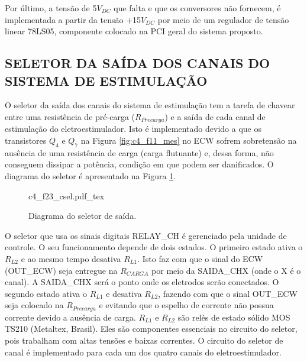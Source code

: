 Por último, a tensão de 5$V_{DC}$ que falta e que os conversores não fornecem, é implementada a partir da tensão +15$V_{DC}$ por meio de um regulador de tensão linear 78LS05, componente colocado na \acrshort{PCI} geral do sistema proposto.



\subsection{SELETOR DA SAÍDA DOS CANAIS DO SISTEMA DE ESTIMULAÇÃO} \label{sec:cap_sec4.2.6}

O seletor da saída dos canais do sistema de estimulação tem a tarefa de chavear entre uma resistência de pré-carga ($R_{Precarga}$) e a saída de cada canal de estimulação do eletroestimulador. Isto é implementado devido a que os transistores $Q_4$ e $Q_7$ na Figura \ref{fig:c4_f11_mes} no \acrshort{ECW} sofrem sobretensão na ausência de uma resistência de carga (carga flutuante) e, dessa forma, não conseguem dissipar a potência, condição em que podem ser danificados. O diagrama do seletor é apresentado na Figura \ref{fig:c4_f23_csel}. 

\begin{figure}[h]
    \centering %
    \small %
    \def\svgwidth{0.8\columnwidth}%
    {c4_f23_csel.pdf_tex}
    \caption{Diagrama do seletor de saída.}
    \label{fig:c4_f23_csel}
\end{figure}

O seletor que usa os sinais digitais RELAY\_CH é gerenciado pela unidade de controle. O seu funcionamento depende de dois estados. O primeiro estado ativa o $R_{L2}$ e ao mesmo tempo desativa $R_{L1}$. Isto faz com que o sinal do \acrshort{ECW} (OUT\_ECW) seja entregue na $R_{CARGA}$ por meio da SAIDA\_CHX (onde o X é o canal). A SAIDA\_CHX será o ponto onde os eletrodos serão conectados. O segundo estado ativa o $R_{L1}$ e desativa $R_{L2}$, fazendo com que o sinal OUT\_ECW seja colocado na $R_{Precarga}$ e evitando que o espelho de corrente não possua corrente devido a ausência de carga. $R_{L1}$ e $R_{L2}$ são relés de estado sólido \acrshort{MOS} TS210 (Metaltex, Brasil). Eles são componentes essenciais no circuito do seletor, pois trabalham com altas tensões e baixas correntes. O circuito do seletor de canal é implementado para cada um dos quatro canais do eletroestimulador.

